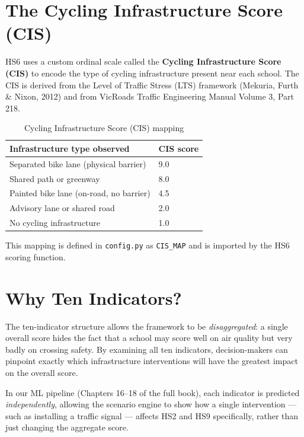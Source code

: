 \documentclass[11pt,a4paper,openany]{book}
\begin{document}
\section{The Cycling Infrastructure Score (CIS)}

HS6 uses a custom ordinal scale called the \textbf{Cycling Infrastructure Score (CIS)} to encode the type of cycling infrastructure present near each school. The CIS is derived from the Level of Traffic Stress (LTS) framework (Mekuria, Furth \& Nixon, 2012) and from VicRoads Traffic Engineering Manual Volume 3, Part 218.

\begin{table}[H]
\centering
\caption{Cycling Infrastructure Score (CIS) mapping}
\begin{tabular}{L{7cm}C{2.5cm}}
\toprule
\textbf{Infrastructure type observed} & \textbf{CIS score} \\
\midrule
Separated bike lane (physical barrier) & 9.0 \\
Shared path or greenway & 8.0 \\
Painted bike lane (on-road, no barrier) & 4.5 \\
Advisory lane or shared road & 2.0 \\
No cycling infrastructure & 1.0 \\
\bottomrule
\end{tabular}
\end{table}

This mapping is defined in \texttt{config.py} as \texttt{CIS\_MAP} and is imported by the HS6 scoring function.

\section{Why Ten Indicators?}

The ten-indicator structure allows the framework to be \textit{disaggregated}: a single overall score hides the fact that a school may score well on air quality but very badly on crossing safety. By examining all ten indicators, decision-makers can pinpoint exactly which infrastructure interventions will have the greatest impact on the overall score.

In our ML pipeline (Chapters 16--18 of the full book), each indicator is predicted \textit{independently}, allowing the scenario engine to show how a single intervention --- such as installing a traffic signal --- affects HS2 and HS9 specifically, rather than just changing the aggregate score.
\end{document}
